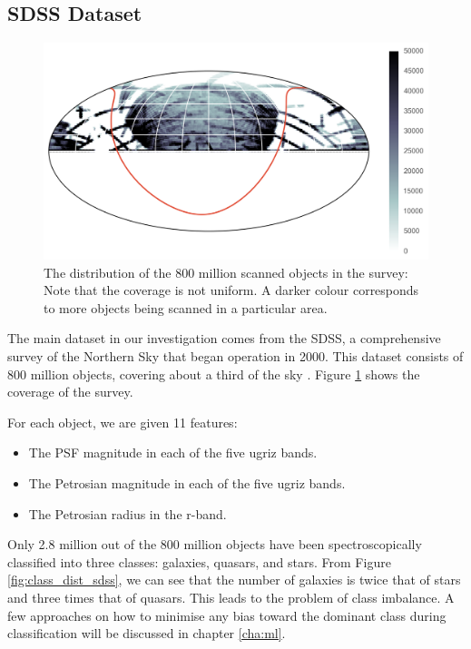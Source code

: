 \subsection{SDSS Dataset}
\begin{figure}[tbp]
	\centering
	\includegraphics[width=\textwidth]{figures/4_expt1/map_prediction_forest_all}
	\caption[Coverage of the SDSS]{The distribution of the 800 million scanned objects
		in the survey: Note that the coverage is not uniform. A darker colour
		corresponds to more objects being scanned in a particular area.}
	\label{fig:coverage}
\end{figure}

The main dataset in our investigation comes from the SDSS, a comprehensive survey of the
Northern Sky that began operation in 2000. This dataset consists of 800 million objects, covering
about a third of the sky \cite{alam15}. Figure \ref{fig:coverage} shows the coverage of the survey.

For each object, we are given 11 features:
	\begin{itemize}
		\item The PSF magnitude in each of the five ugriz bands.
		\item The Petrosian magnitude in each of the five ugriz bands.
		\item The Petrosian radius in the r-band.
	\end{itemize}
Only 2.8 million out of the 800 million objects have been spectroscopically classified into three
classes: galaxies, quasars, and stars. From Figure \ref{fig:class_dist_sdss}, we can see that the
number of galaxies is twice that of stars and three times that of quasars. This leads to
the problem of class imbalance. A few approaches on how to minimise any bias toward
the dominant class during classification will be discussed in chapter \ref{cha:ml}.

